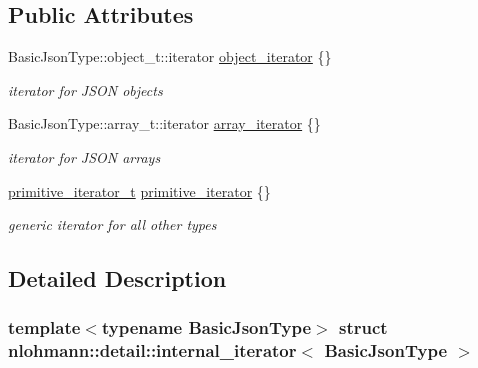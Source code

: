 \subsection*{Public Attributes}
\begin{DoxyCompactItemize}
\item 
\mbox{\label{structnlohmann_1_1detail_1_1internal__iterator_a8cb0af3498061426c1d0a65ad6220408}} 
Basic\+Json\+Type\+::object\+\_\+t\+::iterator \hyperlink{structnlohmann_1_1detail_1_1internal__iterator_a8cb0af3498061426c1d0a65ad6220408}{object\+\_\+iterator} \{\}
\begin{DoxyCompactList}\small\item\em iterator for J\+S\+ON objects \end{DoxyCompactList}\item 
\mbox{\label{structnlohmann_1_1detail_1_1internal__iterator_a8294a6e6f01b58e1cce8fbae66a50b5d}} 
Basic\+Json\+Type\+::array\+\_\+t\+::iterator \hyperlink{structnlohmann_1_1detail_1_1internal__iterator_a8294a6e6f01b58e1cce8fbae66a50b5d}{array\+\_\+iterator} \{\}
\begin{DoxyCompactList}\small\item\em iterator for J\+S\+ON arrays \end{DoxyCompactList}\item 
\mbox{\label{structnlohmann_1_1detail_1_1internal__iterator_a2b3bb45f968210e42c282017eeeb63a8}} 
\hyperlink{classnlohmann_1_1detail_1_1primitive__iterator__t}{primitive\+\_\+iterator\+\_\+t} \hyperlink{structnlohmann_1_1detail_1_1internal__iterator_a2b3bb45f968210e42c282017eeeb63a8}{primitive\+\_\+iterator} \{\}
\begin{DoxyCompactList}\small\item\em generic iterator for all other types \end{DoxyCompactList}\end{DoxyCompactItemize}


\subsection{Detailed Description}
\subsubsection*{template$<$typename Basic\+Json\+Type$>$\newline
struct nlohmann\+::detail\+::internal\+\_\+iterator$<$ Basic\+Json\+Type $>$}

